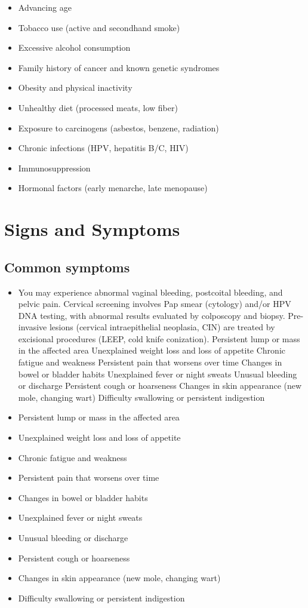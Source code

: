 \begin{itemize}[noitemsep]
  \item Advancing age
  \item Tobacco use (active and secondhand smoke)
  \item Excessive alcohol consumption
  \item Family history of cancer and known genetic syndromes
  \item Obesity and physical inactivity
  \item Unhealthy diet (processed meats, low fiber)
  \item Exposure to carcinogens (asbestos, benzene, radiation)
  \item Chronic infections (HPV, hepatitis B/C, HIV)
  \item Immunosuppression
  \item Hormonal factors (early menarche, late menopause)
\end{itemize}
\section{Signs and Symptoms}

\subsection{Common symptoms}
\begin{itemize}[noitemsep]
  \item You may experience abnormal vaginal bleeding, postcoital bleeding, and pelvic pain. Cervical screening involves Pap smear (cytology) and/or HPV DNA testing, with abnormal results evaluated by colposcopy and biopsy. Pre-invasive lesions (cervical intraepithelial neoplasia, CIN) are treated by excisional procedures (LEEP, cold knife conization). Persistent lump or mass in the affected area Unexplained weight loss and loss of appetite Chronic fatigue and weakness Persistent pain that worsens over time Changes in bowel or bladder habits Unexplained fever or night sweats Unusual bleeding or discharge Persistent cough or hoarseness Changes in skin appearance (new mole, changing wart) Difficulty swallowing or persistent indigestion
  \item Persistent lump or mass in the affected area
  \item Unexplained weight loss and loss of appetite
  \item Chronic fatigue and weakness
  \item Persistent pain that worsens over time
  \item Changes in bowel or bladder habits
  \item Unexplained fever or night sweats
  \item Unusual bleeding or discharge
  \item Persistent cough or hoarseness
  \item Changes in skin appearance (new mole, changing wart)
  \item Difficulty swallowing or persistent indigestion
\end{itemize}

